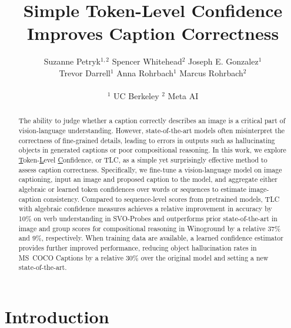 \documentclass[10pt,twocolumn,letterpaper]{article}
\newcommand{\ApproachNameLong}{\underline{T}oken-\underline{L}evel \underline{C}onfidence\xspace}
\begin{document}
\title{Simple Token-Level Confidence Improves Caption Correctness}

 \author{Suzanne Petryk$^{1,2}$ \qquad
Spencer Whitehead$^2$ \qquad
Joseph E. Gonzalez$^1$ \qquad \\
Trevor Darrell$^1$ \qquad
Anna Rohrbach$^1$ \qquad
Marcus Rohrbach$^2$ \\ \\
\vspace{-.5em}
$^1$ UC Berkeley \qquad $^2$ Meta AI
\vspace{-.8em}
}


\maketitle
\ificcvfinal\thispagestyle{empty}\fi


\begin{abstract}


The ability to judge whether a caption correctly describes an image is a critical part of vision-language understanding. However, state-of-the-art models often misinterpret the correctness of fine-grained details, leading to errors in outputs such as hallucinating objects in generated captions or poor compositional reasoning. In this work, we explore \ApproachNameLong, or TLC, as a simple yet surprisingly effective method to assess caption correctness. Specifically, we fine-tune a vision-language model on image captioning, input an image and proposed caption to the model, and aggregate either algebraic or learned token confidences over words or sequences to estimate image-caption consistency. Compared to sequence-level scores from pretrained models, TLC with algebraic confidence measures achieves a relative improvement in accuracy by 10\% on verb understanding in SVO-Probes and outperforms prior state-of-the-art in image and group scores for compositional reasoning in Winoground by a relative 37\% and 9\%, respectively. When training data are available, a learned confidence estimator provides further improved performance, reducing object hallucination rates in MS~COCO Captions by a relative 30\% over the original model and setting a new state-of-the-art. 

\end{abstract}

\section{Introduction}
\label{sec:intro}
\end{document}
